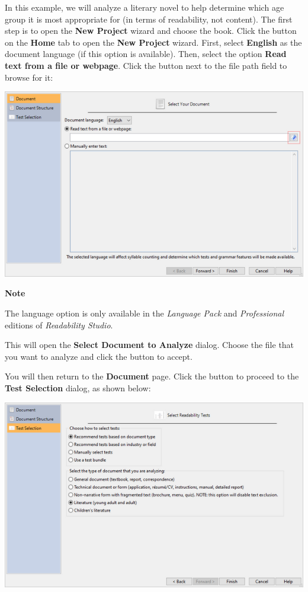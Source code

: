 \documentclass[
]{book}
\newenvironment{notesection}
    {
    \begin{tcolorbox}[colframe=mediumblue,colback=lightblue,coltext=mediumblue,arc=3mm]
    \faLightbulb[regular] \textbf{Note} \newline
    }
    {
    \end{tcolorbox}
    }
\theoremstyle{definition}
\theoremstyle{definition}
\theoremstyle{definition}
\theoremstyle{definition}
\theoremstyle{remark}
\begin{document}
In this example, we will analyze a literary novel to help determine which age group it is most appropriate for (in terms of readability, not content). The first step is to open the \textbf{New Project} wizard and choose the book. Click the  button on the \textbf{Home} tab to open the \textbf{New Project} wizard. First, select \textbf{English} as the document language (if this option is available). Then, select the option \textbf{Read text from a file or webpage}. Click the button next to the file path field to browse for it:

\includegraphics{Images/exampleselectfile.png}

\begin{notesection}
The language option is only available in the \emph{Language Pack} and \emph{Professional} editions of \emph{Readability Studio}.

\end{notesection}

This will open the \textbf{Select Document to Analyze} dialog. Choose the file that you want to analyze and click the  button to accept.

You will then return to the \textbf{Document} page. Click the  button to proceed to the \textbf{Test Selection} dialog, as shown below:

\includegraphics{Images/wizardreadabilitymethods.png}
\end{document}

